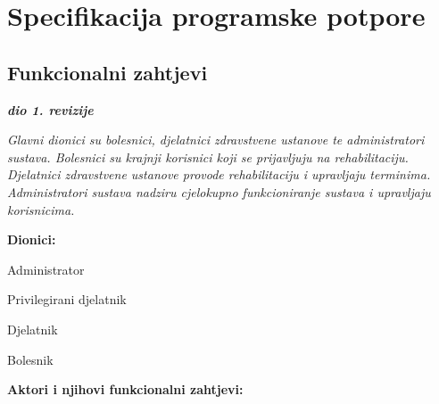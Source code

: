 \chapter{Specifikacija programske potpore}

\section{Funkcionalni zahtjevi}

\textbf{\textit{dio 1. revizije}}

\textit{ Glavni dionici su bolesnici, djelatnici zdravstvene ustanove te administratori sustava. Bolesnici su krajnji korisnici koji se prijavljuju na rehabilitaciju. Djelatnici zdravstvene ustanove provode rehabilitaciju i upravljaju terminima. Administratori sustava nadziru cjelokupno funkcioniranje sustava i upravljaju korisnicima.}


\noindent \textbf{Dionici:}

\begin{packed_enum}

	\item Administrator
	\item Privilegirani djelatnik
	\item Djelatnik
	\item Bolesnik

\end{packed_enum}

\noindent \textbf{Aktori i njihovi funkcionalni zahtjevi:}


